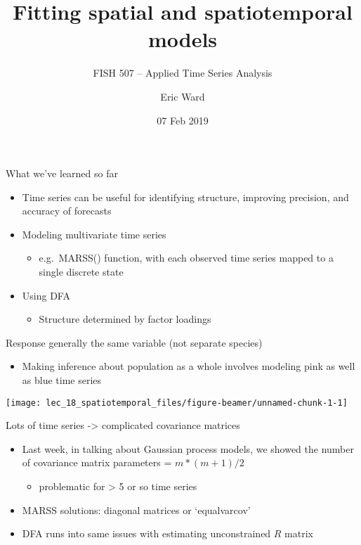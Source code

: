\documentclass[ignorenonframetext,]{beamer}
\title{Fitting spatial and spatiotemporal models}
\subtitle{FISH 507 -- Applied Time Series Analysis}
\author{Eric Ward}
\date{07 Feb 2019}
\providecommand{\tightlist}{%
  \setlength{\itemsep}{0pt}\setlength{\parskip}{0pt}}
\begin{document}
\frame{\titlepage}

\begin{frame}{What we've learned so far}
\protect\hypertarget{what-weve-learned-so-far}{}

\begin{itemize}
\item
  Time series can be useful for identifying structure, improving
  precision, and accuracy of forecasts
\item
  Modeling multivariate time series

  \begin{itemize}
  \tightlist
  \item
    e.g.~MARSS() function, with each observed time series mapped to a
    single discrete state
  \end{itemize}
\item
  Using DFA

  \begin{itemize}
  \tightlist
  \item
    Structure determined by factor loadings
  \end{itemize}
\end{itemize}

\end{frame}

\begin{frame}{Response generally the same variable (not separate
species)}
\protect\hypertarget{response-generally-the-same-variable-not-separate-species}{}

\begin{itemize}
\tightlist
\item
  Making inference about population as a whole involves modeling pink as
  well as blue time series
\end{itemize}

\begin{center}\texttt{[image: lec\_18\_spatiotemporal\_files/figure-beamer/unnamed-chunk-1-1]} \end{center}

\end{frame}

\begin{frame}{Lots of time series -\textgreater{} complicated covariance
matrices}
\protect\hypertarget{lots-of-time-series---complicated-covariance-matrices}{}

\begin{itemize}
\item
  Last week, in talking about Gaussian process models, we showed the
  number of covariance matrix parameters = \(m*(m+1)/2\)

  \begin{itemize}
  \tightlist
  \item
    problematic for \textgreater{} 5 or so time series
  \end{itemize}
\item
  MARSS solutions: diagonal matrices or `equalvarcov'
\item
  DFA runs into same issues with estimating unconstrained \(R\) matrix
\end{itemize}

\end{frame}
\end{document}
